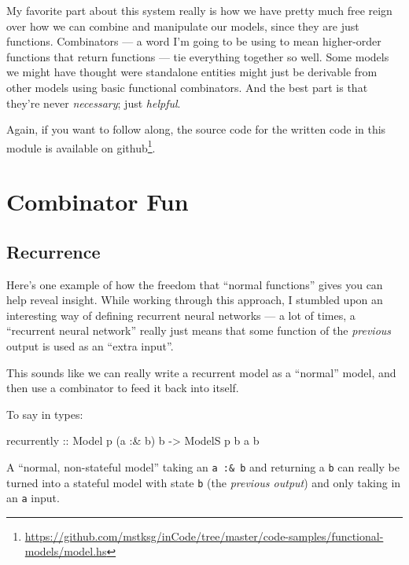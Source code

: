 \documentclass[]{article}
\newenvironment{Shaded}{}{}
\newcommand{\DataTypeTok}[1]{\textcolor[rgb]{0.56,0.13,0.00}{#1}}
\newcommand{\NormalTok}[1]{#1}
\newcommand{\OperatorTok}[1]{\textcolor[rgb]{0.40,0.40,0.40}{#1}}
\newcommand{\OtherTok}[1]{\textcolor[rgb]{0.00,0.44,0.13}{#1}}
\renewcommand{\href}[2]{#2\footnote{\url{#1}}}
\begin{document}
My favorite part about this system really is how we have pretty much free reign
over how we can combine and manipulate our models, since they are just
functions. Combinators --- a word I'm going to be using to mean higher-order
functions that return functions --- tie everything together so well. Some models
we might have thought were standalone entities might just be derivable from
other models using basic functional combinators. And the best part is that
they're never \emph{necessary}; just \emph{helpful}.

Again, if you want to follow along, the source code for the written code in this
module is available
\href{https://github.com/mstksg/inCode/tree/master/code-samples/functional-models/model.hs}{on
github}.

\section{Combinator Fun}\label{combinator-fun}

\subsection{Recurrence}\label{recurrence}

Here's one example of how the freedom that ``normal functions'' gives you can
help reveal insight. While working through this approach, I stumbled upon an
interesting way of defining recurrent neural networks --- a lot of times, a
``recurrent neural network'' really just means that some function of the
\emph{previous} output is used as an ``extra input''.

This sounds like we can really write a recurrent model as a ``normal'' model,
and then use a combinator to feed it back into itself.

To say in types:

\begin{Shaded}
\begin{Highlighting}[]
\NormalTok{recurrently}
\OtherTok{    ::} \DataTypeTok{Model}\NormalTok{  p   (a }\OperatorTok{:\&}\NormalTok{ b) b}
    \OtherTok{{-}\textgreater{}} \DataTypeTok{ModelS}\NormalTok{ p b  a       b}
\end{Highlighting}
\end{Shaded}

A ``normal, non-stateful model'' taking an \texttt{a\ :\&\ b} and returning a
\texttt{b} can really be turned into a stateful model with state \texttt{b} (the
\emph{previous output}) and only taking in an \texttt{a} input.
\end{document}
